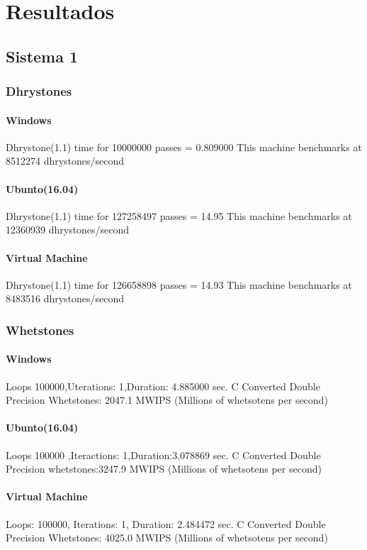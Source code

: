 \documentclass{report}
\begin{document}
\chapter{Resultados}
\label{chap.resultados}
\section{Sistema 1} 
\subsection{Dhrystones}

\subsubsection{Windows}
Dhrystone(1.1) time for 10000000
passes = 0.809000
This machine benchmarks at 8512274 dhrystones/second

\subsubsection{Ubunto(16.04)}
Dhrystone(1.1) time for 127258497 
passes = 14.95
This machine benchmarks at 12360939 dhrystones/second
\subsubsection{Virtual Machine}
Dhrystone(1.1) time for 126658898 passes = 14.93
This machine benchmarks at 8483516 dhrystones/second
\subsection{Whetstones}
\subsubsection{Windows}
Loops 100000,Uterations: 1,Duration: 4.885000 sec.
C Converted Double Precision Whetstones: 2047.1 MWIPS (Millions of whetsotens per second)

\subsubsection{Ubunto(16.04)}
Loops 100000 ,Iteractions: 1,Duration:3.078869 sec.
C Converted Double Precision whetstones:3247.9 MWIPS (Millions of whetsotens per second)
\subsubsection{Virtual Machine}
Loops: 100000, Iterations: 1, Duration: 2.484472 sec.
C Converted Double Precision Whetstones: 4025.0 MWIPS (Millions of whetsotens per second)
\end{document}

